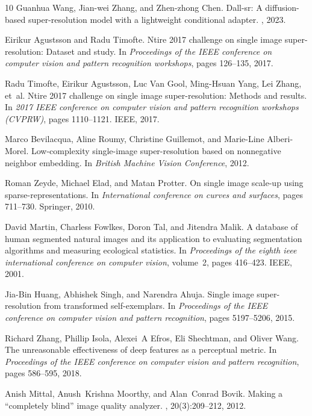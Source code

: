 \documentclass[10pt,twocolumn,letterpaper]{article}
\begin{document}
\begin{thebibliography}{10}
Guanhua Wang, Jian-wei Zhang, and Zhen-zhong Chen.
\newblock Dall-sr: A diffusion-based super-resolution model with a lightweight conditional adapter.
, 2023.

Eirikur Agustsson and Radu Timofte.
\newblock Ntire 2017 challenge on single image super-resolution: Dataset and study.
\newblock In {\em Proceedings of the IEEE conference on computer vision and pattern recognition workshops}, pages 126--135, 2017.

Radu Timofte, Eirikur Agustsson, Luc Van Gool, Ming-Hsuan Yang, Lei Zhang, et~al.
\newblock Ntire 2017 challenge on single image super-resolution: Methods and results.
\newblock In {\em 2017 IEEE conference on computer vision and pattern recognition workshops (CVPRW)}, pages 1110--1121. IEEE, 2017.

Marco Bevilacqua, Aline Roumy, Christine Guillemot, and Marie-Line Alberi-Morel.
\newblock Low-complexity single-image super-resolution based on nonnegative neighbor embedding.
\newblock In {\em British Machine Vision Conference}, 2012.

Roman Zeyde, Michael Elad, and Matan Protter.
\newblock On single image scale-up using sparse-representations.
\newblock In {\em International conference on curves and surfaces}, pages 711--730. Springer, 2010.

David Martin, Charless Fowlkes, Doron Tal, and Jitendra Malik.
\newblock A database of human segmented natural images and its application to evaluating segmentation algorithms and measuring ecological statistics.
\newblock In {\em Proceedings of the eighth ieee international conference on computer vision}, volume~2, pages 416--423. IEEE, 2001.

Jia-Bin Huang, Abhishek Singh, and Narendra Ahuja.
\newblock Single image super-resolution from transformed self-exemplars.
\newblock In {\em Proceedings of the IEEE conference on computer vision and pattern recognition}, pages 5197--5206, 2015.

Richard Zhang, Phillip Isola, Alexei~A Efros, Eli Shechtman, and Oliver Wang.
\newblock The unreasonable effectiveness of deep features as a perceptual metric.
\newblock In {\em Proceedings of the IEEE conference on computer vision and pattern recognition}, pages 586--595, 2018.

Anish Mittal, Anush~Krishna Moorthy, and Alan~Conrad Bovik.
\newblock Making a “completely blind” image quality analyzer.
, 20(3):209--212, 2012.

\end{thebibliography}
\end{document}
